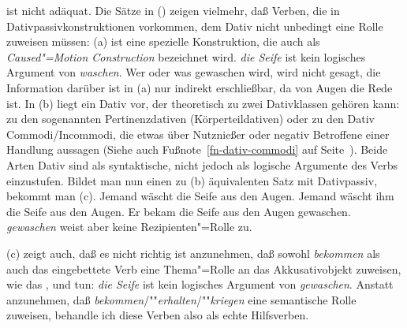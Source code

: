 ist nicht adäquat.
Die Sätze in () zeigen vielmehr, daß Verben, die in Dativpassivkonstruktionen
vorkommen, dem Dativ nicht unbedingt eine Rolle zuweisen müssen:
(a) ist eine spezielle Konstruktion, die auch als \emph{Caused"=Motion
Construction} bezeichnet wird. \emph{die Seife} ist kein logisches
Argument von \emph{waschen}. Wer oder was gewaschen wird, wird nicht gesagt,
die Information darüber ist in (a) nur indirekt erschließbar, da
von Augen die Rede ist. In (b) liegt ein Dativ vor, der theoretisch
zu zwei Dativklassen gehören kann: zu den sogenannten Pertinenzdativen
(Körperteildativen) oder zu den Dativ Commodi/Incommodi,
die etwas über Nutznießer oder negativ Betroffene einer Handlung aussagen
(Siehe auch Fußnote~\ref{fn-dativ-commodi} auf Seite~\pageref{fn-dativ-commodi}). Beide Arten
Dativ sind als syntaktische, nicht jedoch als logische Argumente des Verbs einzustufen.
Bildet man nun einen zu (b) äquivalenten Satz mit Dativpassiv,
bekommt man (c).
\eal
\label{ex-bekommen-passive-und-waschen}
\ex Jemand wäscht     die Seife aus den Augen.
\ex Jemand wäscht ihm die Seife aus den Augen.
\ex\label{ex-er-bekam-die-seife-aus-den-augen-gewaschen}
Er bekam die Seife aus den Augen gewaschen.
\zl
\emph{gewaschen} weist aber keine Rezipienten"=Rolle zu.

(c) zeigt auch, daß es nicht richtig ist anzunehmen, daß sowohl \emph{bekommen} als auch das
eingebettete Verb eine Thema"=Rolle an das Akkusativobjekt zuweisen,
wie das \citet[]{Haider86}, \citet[]{HM94a}
und \citet[]{Kathol2000a} tun: \emph{die Seife} ist kein logisches
Argument von \emph{gewaschen}.
Anstatt anzunehmen, daß \emph{bekommen}/""\emph{erhalten}/""\emph{kriegen} 
eine semantische Rolle zuweisen, behandle ich diese Verben also als echte Hilfsverben.



